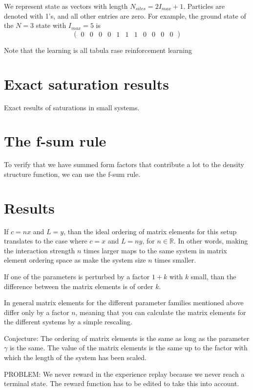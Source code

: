 \documentclass[11pt, a4paper]{report} %
\begin{document}
We represent state as vectors with length $N_{sites} = 2 I_{max} + 1$.
Particles are denoted with 1's, and all other entries are zero.
For example, the ground state of the $N=3$ state with $I_{max} = 5$ is 
\begin{equation}
  \begin{pmatrix} 0 & 0 & 0 & 0 & 1 & 1 & 1 & 0 & 0 & 0 & 0 \end{pmatrix}
\end{equation}

Note that the learning is all tabula rase reinforcement learning

\section{Exact saturation results}

Exact results of saturations in small systems.

\section{The f-sum rule}
To verify that we have summed form factors that contribute a lot to the density structure function, we can use the f-sum rule.

\section{Results}

If $c = n  x$ and $L = y$, than the ideal ordering of matrix elements for this setup translates to the case where $c = x$ and $L = n y$, for $n \in \mathbb{R}$.
In other words, making the interaction strength $n$ times larger maps to the same system in matrix element ordering space as make the system size $n$ times smaller.

If one of the parameters is perturbed by a factor $1+k$ with $k$ small, than the difference between the matrix elements is of order $k$.

In general matrix elements for the different parameter families mentioned above differ only by a factor $n$, meaning that you can calculate the matrix elements for the different systems by a simple rescaling.

Conjecture: The ordering of matrix elements is the same as long as the parameter $\gamma$ is the same. The value of the matrix elements is the same up to the factor with which the length of the system has been scaled.

PROBLEM: We never reward in the experience replay because we never reach a terminal state. The reward function has to be edited to take this into account.
\end{document}

